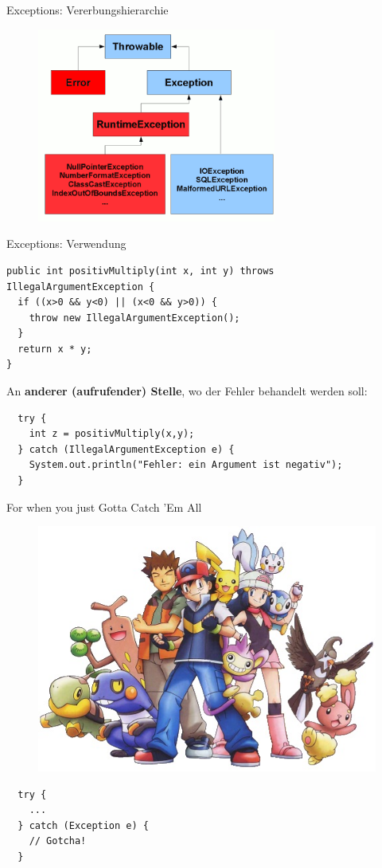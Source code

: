 \documentclass[18pt]{beamer}
\begin{document}
\begin{frame}[fragile]{Exceptions: Vererbungshierarchie}
\begin{figure}[ht]
	\centering
  \includegraphics[width=0.7\textwidth]{ExceptionHierarchy.png}
\end{figure}
\end{frame}

\begin{frame}[fragile]{Exceptions: Verwendung}
	\begin{lstlisting}
public int positivMultiply(int x, int y) throws IllegalArgumentException {
  if ((x>0 && y<0) || (x<0 && y>0)) {
    throw new IllegalArgumentException();
  }
  return x * y;
}
  \end{lstlisting}
  \pause
  An \textbf{anderer (aufrufender) Stelle}, wo der Fehler behandelt werden soll:
  \begin{lstlisting}
  try {
    int z = positivMultiply(x,y);
  } catch (IllegalArgumentException e) {
    System.out.println("Fehler: ein Argument ist negativ");
  }
  \end{lstlisting}
\end{frame}

\begin{frame}[fragile]{For when you just Gotta Catch 'Em All}
	\begin{figure}%
  \includegraphics[width=0.5\columnwidth]{pokemon.jpeg}%
  \end{figure}
  \begin{lstlisting}
  try {
    ...
  } catch (Exception e) {
    // Gotcha!
  }
  \end{lstlisting}
\end{frame}
\end{document}

